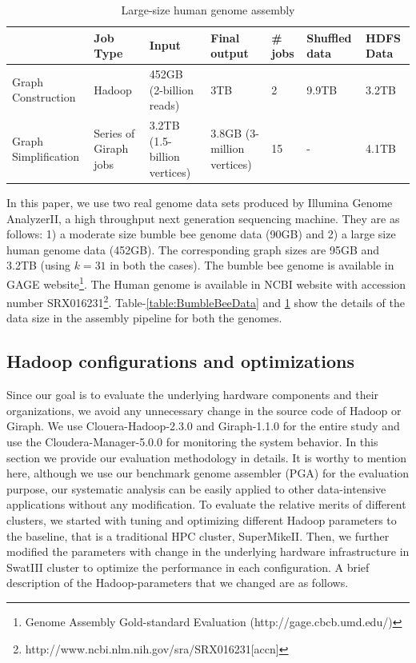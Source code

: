 \documentclass[conference]{IEEEtran}
\begin{document}
\begin{table}
\begin{center}
    \begin{tabular}{ |p{1cm} | p{0.7cm} | p{1cm} | p{0.7cm} | p{0.7cm} | p{0.7cm} | p{0.7cm}|} \hline
    & Job Type & Input & Final output & \# jobs & Shuffled data & HDFS Data \\ \hline
    Graph Construction & Hadoop & 452GB (2-billion reads) & 3TB & 2 & 9.9TB & 3.2TB \\ \hline
    Graph Simplification & Series of Giraph jobs & 3.2TB (1.5-billion vertices) & 3.8GB (3-million vertices) & 15 & - & 4.1TB \\ \hline    
    \end{tabular}
    \caption{Large-size human genome assembly}
	\label{table:HumanData}
\end{center}
\vspace{-3.0em}
\end{table}
In this paper, we use two real genome data sets produced by Illumina Genome AnalyzerII, a high throughput next generation sequencing machine. They are as follows: 1) a moderate size bumble bee genome data (90GB) and 2) a large size human genome data (452GB). The corresponding graph sizes are 95GB and 3.2TB (using $k=31$ in both the cases). The bumble bee genome is available in GAGE \cite{bio:gage} website\footnote{Genome Assembly Gold-standard Evaluation (http://gage.cbcb.umd.edu/)}. The Human genome is available in NCBI website with accession number SRX016231\footnote{http://www.ncbi.nlm.nih.gov/sra/SRX016231[accn]}. Table-\ref{table:BumbleBeeData} and \ref{table:HumanData} show the details of the data size in the assembly pipeline for both the genomes. 

\subsection {Hadoop configurations and optimizations} \label{HadoopConfigurationsAndoptimizations}
Since our goal is to evaluate the underlying hardware components and their organizations, we avoid any unnecessary change in the source code of Hadoop or Giraph. We use Clouera-Hadoop-2.3.0 and Giraph-1.1.0 for the entire study and use the Cloudera-Manager-5.0.0 for monitoring the system behavior. In this section we provide our evaluation methodology in details. It is worthy to mention here, although we use our benchmark genome assembler (PGA) for the evaluation purpose, our systematic analysis can be easily applied to other data-intensive applications without any modification. To evaluate the relative merits of different clusters, we started with tuning and optimizing different Hadoop parameters to the baseline, that is a traditional HPC cluster, SuperMikeII. Then, we further modified the parameters with change in the underlying hardware infrastructure in SwatIII cluster to optimize the performance in each configuration. A brief description of the Hadoop-parameters that we changed are as follows.
  
\end{document}
